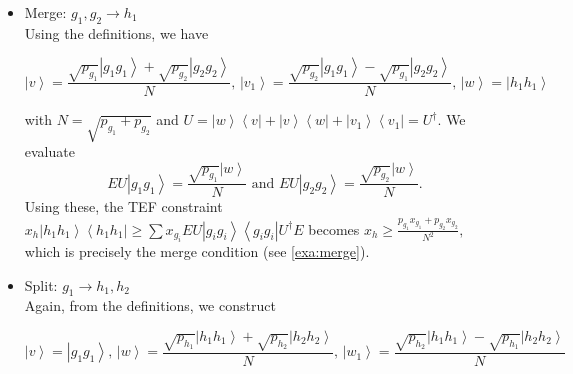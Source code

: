 \documentclass{article}
\begin{document}
\begin{itemize}
  \item Merge: $g_{1},g_{2}\to h_{1}$\\
        Using the definitions, we have
        \begin{small}
          \begin{displaymath}
            \left|v\right\rangle =\frac{\sqrt{p_{g_{1}}}\left|g_{1}g_{1}\right\rangle +\sqrt{p_{g_{2}}}\left|g_{2}g_{2}\right\rangle }{N},\,\left|v_{1}\right\rangle =\frac{\sqrt{p_{g_{2}}}\left|g_{1}g_{1}\right\rangle -\sqrt{p_{g_{1}}}\left|g_{2}g_{2}\right\rangle }{N},\,\left|w\right\rangle =\left|h_{1}h_{1}\right\rangle
          \end{displaymath}
        \end{small}

        with $N=\sqrt{p_{g_{1}}+p_{g_{2}}}$ and
        $
          U=\left|w\right\rangle \left\langle v\right|+\left|v\right\rangle \left\langle w\right|+\left|v_{1}\right\rangle \left\langle v_{1}\right|=U^\dagger.
        $
        We evaluate
        \begin{displaymath}
          EU\left|g_{1}g_{1}\right\rangle =\frac{\sqrt{p_{g_{1}}}\left|w\right\rangle }{N} \text{ and } EU\left|g_{2}g_{2}\right\rangle =\frac{\sqrt{p_{g_{2}}}\left|w\right\rangle }{N}.
        \end{displaymath}
        Using these, the TEF constraint
        $
          x_{h}\left|h_{1}h_{1}\right\rangle \left\langle h_{1}h_{1}\right|\ge\sum x_{g_{i}}EU\left|g_{i}g_{i}\right\rangle \left\langle g_{i}g_{i}\right|U^{\dagger}E
        $ becomes
        $
          x_{h}\ge\frac{p_{g_{1}}x_{g_{1}}+p_{g_{2}}x_{g_{2}}}{N^{2}},
        $
        which is precisely the merge condition (see \cref{exa:merge}).

  \item Split: $g_{1}\to h_{1},h_{2}$\\
        Again, from the definitions, we construct
        \begin{small}
          \begin{displaymath}
            \left|v\right\rangle =\left|g_{1}g_{1}\right\rangle ,\,\left|w\right\rangle =\frac{\sqrt{p_{h_{1}}}\left|h_{1}h_{1}\right\rangle +\sqrt{p_{h_{2}}}\left|h_{2}h_{2}\right\rangle }{N},\,\left|w_{1}\right\rangle =\frac{\sqrt{p_{h_{2}}}\left|h_{1}h_{1}\right\rangle -\sqrt{p_{h_{1}}}\left|h_{2}h_{2}\right\rangle }{N}
          \end{displaymath}
        \end{small}


\end{itemize}
\end{document}
